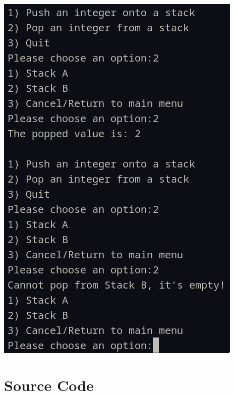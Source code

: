 \documentclass{article}
\begin{document}
\begin{multicols}{2}
    \begin{center}
    \includegraphics[width=0.8\linewidth]{./res/2b.png}
    \end{center}
\end{multicols}


\pagebreak
\section*{Source Code}
\inputminted{java}{./P1.java}
\end{document}
